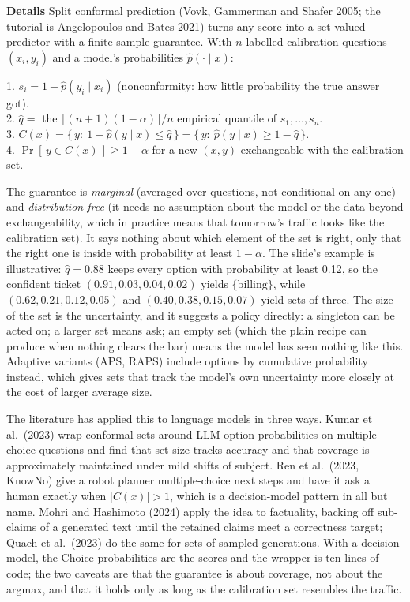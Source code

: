 \documentclass[11pt,letterpaper]{article}
\newcommand{\para}[1]{\medskip\noindent\textbf{#1}\quad}
\newenvironment{formulas}{\begin{tcolorbox}[formulabox]}{\end{tcolorbox}}
\begin{document}
\para{Details} Split conformal prediction (Vovk, Gammerman and Shafer 2005; the tutorial is Angelopoulos and Bates 2021) turns any score into a set-valued predictor with a finite-sample guarantee. With $n$ labelled calibration questions $(x_i,y_i)$ and a model's probabilities $\hat p(\cdot\mid x)$:
\begin{formulas}
1. $s_i=1-\hat p(y_i\mid x_i)$ \quad (nonconformity: how little probability the true answer got).\\
2. $\hat q=$ the $\lceil (n+1)(1-\alpha)\rceil/n$ empirical quantile of $s_1,\dots,s_n$.\\
3. $C(x)=\{\,y:\ 1-\hat p(y\mid x)\leq\hat q\,\}=\{\,y:\ \hat p(y\mid x)\geq1-\hat q\,\}$.\\
4. $\Pr[\,y\in C(x)\,]\geq1-\alpha$ for a new $(x,y)$ exchangeable with the calibration set.
\end{formulas}
The guarantee is \emph{marginal} (averaged over questions, not conditional on any one) and \emph{distribution-free} (it needs no assumption about the model or the data beyond exchangeability, which in practice means that tomorrow's traffic looks like the calibration set). It says nothing about which element of the set is right, only that the right one is inside with probability at least $1-\alpha$. The slide's example is illustrative: $\hat q=0.88$ keeps every option with probability at least 0.12, so the confident ticket $(0.91,0.03,0.04,0.02)$ yields $\{\text{billing}\}$, while $(0.62,0.21,0.12,0.05)$ and $(0.40,0.38,0.15,0.07)$ yield sets of three. The size of the set is the uncertainty, and it suggests a policy directly: a singleton can be acted on; a larger set means ask; an empty set (which the plain recipe can produce when nothing clears the bar) means the model has seen nothing like this. Adaptive variants (APS, RAPS) include options by cumulative probability instead, which gives sets that track the model's own uncertainty more closely at the cost of larger average size.

The literature has applied this to language models in three ways. Kumar et al.\ (2023) wrap conformal sets around LLM option probabilities on multiple-choice questions and find that set size tracks accuracy and that coverage is approximately maintained under mild shifts of subject. Ren et al.\ (2023, KnowNo) give a robot planner multiple-choice next steps and have it ask a human exactly when $|C(x)|>1$, which is a decision-model pattern in all but name. Mohri and Hashimoto (2024) apply the idea to factuality, backing off sub-claims of a generated text until the retained claims meet a correctness target; Quach et al.\ (2023) do the same for sets of sampled generations. With a decision model, the Choice probabilities are the scores and the wrapper is ten lines of code; the two caveats are that the guarantee is about coverage, not about the argmax, and that it holds only as long as the calibration set resembles the traffic.
\end{document}
